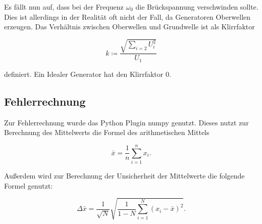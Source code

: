 Es fällt nun auf, dass bei der Frequenz $\omega_0$ die Brückspannung verschwinden sollte.
Dies ist allerdings in der Realität oft nicht der Fall, da Generatoren Oberwellen erzeugen.
Das Verhältnis zwischen Oberwellen und Grundwelle ist als Klirrfaktor

\begin{equation}
    k \coloneq \frac{\sqrt{\sum_{i=2} U_i^2}}{U_1}
    \label{eqn:wien_klirr}
\end{equation}

definiert. Ein Idealer Generator hat den Klirrfaktor 0.

\subsection{Fehlerrechnung}

Zur Fehlerrechnung wurde das Python Plugin numpy \cite{numpy} genutzt.
Dieses nutzt zur Berechnung des Mittelwerts die Formel des arithmetischen Mittels

\begin{equation}
    \bar{x} = \frac{1}{n} \sum_{i=1}^n x_i.
    \label{eqn:mittel}
\end{equation}

Außerdem wird zur Berechnung der Unsicherheit der Mittelwerte die folgende Formel genutzt:

\begin{equation}
    \Delta \bar{x} = \frac{1}{\sqrt{N}} \sqrt{\frac{1}{1-N} \sum_{i=1}^N (x_i-\bar{x})^2}.
    \label{eqn:fehler}
\end{equation}

